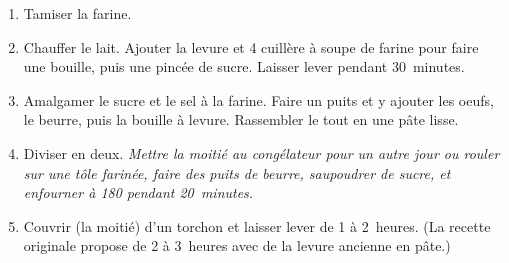 

\begin{ingredients}
\end{ingredients}


\begin{recipe}
  \begin{enumerate}

  \item Tamiser la farine.

  \item Chauffer le lait.  Ajouter la levure et 4 cuillère à soupe de
    farine pour faire une bouille, puis une pincée de sucre.  Laisser
    lever pendant 30~minutes.

  \item Amalgamer le sucre et le sel à la farine.  Faire un puits et y
    ajouter les oeufs, le beurre, puis la bouille à levure.
    Rassembler le tout en une pâte lisse.

  \item Diviser en deux.  {\it Mettre la moitié au congélateur pour un
      autre jour ou rouler sur une tôle farinée, faire des puits de
      beurre, saupoudrer de sucre, et enfourner à 180\degreeC{} pendant
      20~minutes.}

  \item Couvrir (la moitié) d'un torchon et laisser lever de 1 à
    2~heures.  (La recette originale propose de 2 à 3~heures avec de
    la levure ancienne en pâte.)

  \end{enumerate}
\end{recipe}


\begin{ingredients}
\end{ingredients}


